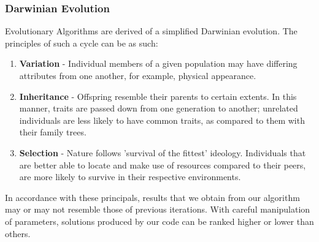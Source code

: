 \documentclass[conference,compsoc]{IEEEtran}
\begin{document}
\subsubsection{Darwinian Evolution}
Evolutionary Algorithms are derived of a simplified Darwinian evolution. The principles of such a cycle can be as such:
\begin{enumerate}
    \item \textbf{Variation} - Individual members of a given population may have differing attributes from one another, for example, physical appearance.
    \item \textbf{Inheritance} - Offspring resemble their parents to certain extents. In this manner, traits are passed down from one generation to another; unrelated individuals are less likely to have common traits, as compared to them with their family trees.
    \item \textbf{Selection} - Nature follows 'survival of the fittest' ideology. Individuals that are better able to locate and make use of resources compared to their peers, are more likely to survive in their respective environments. 
\end{enumerate}
In accordance with these principals, results that we obtain from our algorithm may or may not resemble those of previous iterations. With careful manipulation of parameters, solutions produced by our code can be ranked higher or lower than others.
\end{document}
